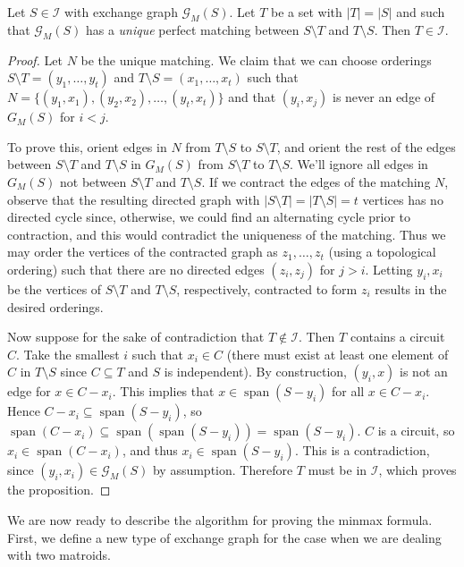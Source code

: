 \documentclass[12pt]{article}
\newcommand{\spn}{\operatorname{span}}
\begin{document}
\begin{proposition} Let $S \in \mathcal{I}$ with exchange graph
$\mathcal{G}_M(S)$. Let $T$ be a set with $|T| = |S|$ and such that
$\mathcal{G}_M(S)$ has a \emph{unique} perfect matching between $S \setminus
T$ and $T \setminus S$. Then $T \in \mathcal{I}$.  \end{proposition}

\begin{proof} Let $N$ be the unique matching. We claim that we can choose orderings $S \setminus T = (y_1, \dots, y_t)$ and $T \setminus S = (x_1, \dots, x_t)$ such that $N =
\{(y_1,x_1),(y_2,x_2),\ldots,(y_t,x_t)\}$ and that $(y_i,x_j)$ is
never an edge of $G_M(S)$ for $i < j$.

To prove this, orient edges in $N$ from
$T \setminus S$ to $S\setminus T$, and orient the rest of the edges between $S \setminus T$ and $T \setminus S$ in $G_M(S)$ from
$S\setminus T$ to $T \setminus S$. We'll ignore all edges in $G_M(S)$ not between $S \setminus T$ and $T \setminus S$. If we contract the edges of the matching $N$,
observe that the resulting directed graph with $|S\setminus T| =|T\setminus S| = t$ vertices has no directed cycle since,
otherwise, we could find an alternating cycle prior to contraction,
and this would contradict the uniqueness of the matching. Thus we may order the vertices of the contracted graph as $z_1, \dots, z_t$ (using a topological ordering) such that there are no directed edges $(z_i, z_j)$ for $j > i$. Letting $y_i, x_i$ be the vertices of $S\setminus T$ and $T\setminus S$, respectively, contracted to form $z_i$ results in the desired orderings.

Now suppose for the sake of contradiction that $T \not\in
\mathcal{I}$. Then $T$ contains a circuit $C$. Take the smallest $i$ such
that $x_i \in C$ (there must exist at least one element of $C$ in $T
\setminus S$ since $C \subseteq T$ and $S$ is independent). By
construction, $(y_i,x)$ is not an edge for $x \in C-x_i$. This implies
that $x \in \spn(S-y_i)$ for all $x \in C-x_i$. Hence $C-x_i \subseteq
\spn(S-y_i)$, so $\spn(C-x_i) \subseteq \spn(\spn(S-y_i)) =
\spn(S-y_i)$. $C$ is a circuit, so $x_i \in \spn(C-x_i)$, and thus $x_i \in
\spn(S-y_i)$. This is a contradiction, since $(y_i,x_i) \in
\mathcal{G}_M(S)$ by assumption. Therefore $T$ must be in
$\mathcal{I}$, which proves the proposition.  \end{proof}

We are now ready to describe the algorithm for proving the minmax
formula. First, we define a new type of exchange graph for the case
when we are dealing with two matroids. 
\end{document}
